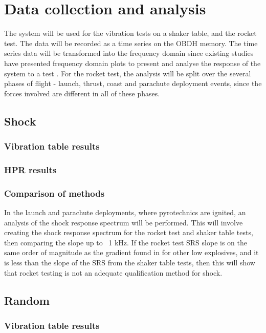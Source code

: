 \documentclass{report}
\begin{document}
\chapter{Data collection and analysis}

The system will be used for the vibration tests on a shaker table, and the rocket test. The data will be recorded as a time series on the OBDH memory. The time series data will be transformed into the frequency domain since existing studies have presented frequency domain plots to present and analyse the response of the system to a test \cite{nasa-pyroshock,nieto2019cubesat}. For the rocket test, the analysis will be split over the several phases of flight - launch, thrust, coast and parachute deployment events, since the forces involved are different in all of these phases.

\section{Shock}
\subsection{Vibration table results}
\subsection{HPR results}
\subsection{Comparison of methods}
In the launch and parachute deployments, where pyrotechnics are ignited, an analysis of the shock response spectrum will be performed. This will involve creating the shock response spectrum for the rocket test and shaker table tests, then comparing the slope up to ~1 kHz. If the rocket test SRS slope is on the same order of magnitude as the gradient found in \cite{wang2023numerical} for other low explosives, and it is less than the slope of the SRS from the shaker table tests, then this will show that rocket testing is not an adequate qualification method for shock.

\section{Random}
\subsection{Vibration table results}
\end{document}
